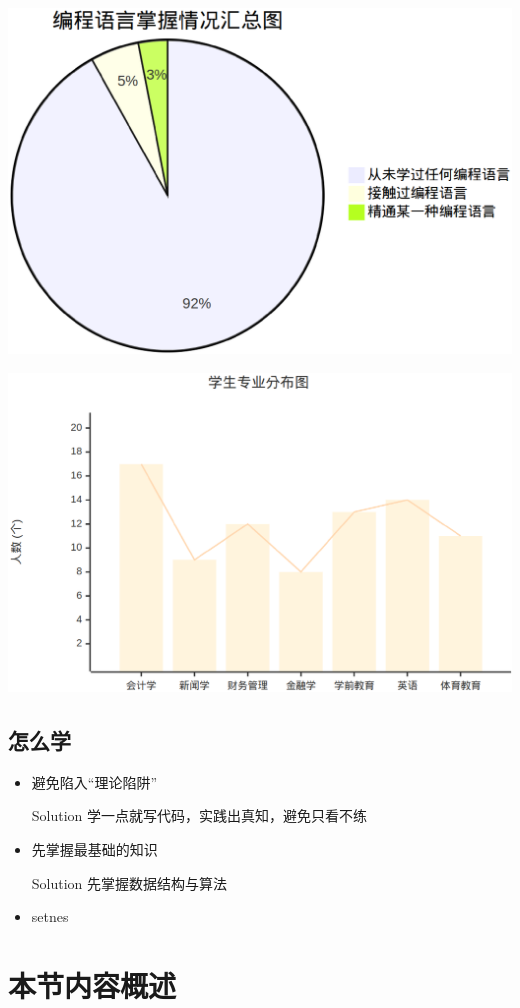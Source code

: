 \documentclass{beamer}
\begin{document}
\begin{frame}[t]
	\begin{center}
		\includegraphics[width=0.4\linewidth]{pie.eps}
	\end{center}
	\pause
	\begin{center}
		\includegraphics[width=0.6\linewidth]{student_number.eps}
	\end{center}
\end{frame}


\subsection{怎么学}

\begin{frame}[t]
	\begin{itemize}
		\item<1-> 避免陷入“理论陷阱”
		      \pause
		      \begin{alertblock}{Solution}
			      学一点就写代码，实践出真知，避免只看不练
		      \end{alertblock}
		\item<3-> 先掌握最基础的知识
		      \begin{alertblock}{Solution}
			      先掌握数据结构与算法
		      \end{alertblock}
		\item<5-> setnes
	\end{itemize}

\end{frame}

\section{本节内容概述}
\end{document}
